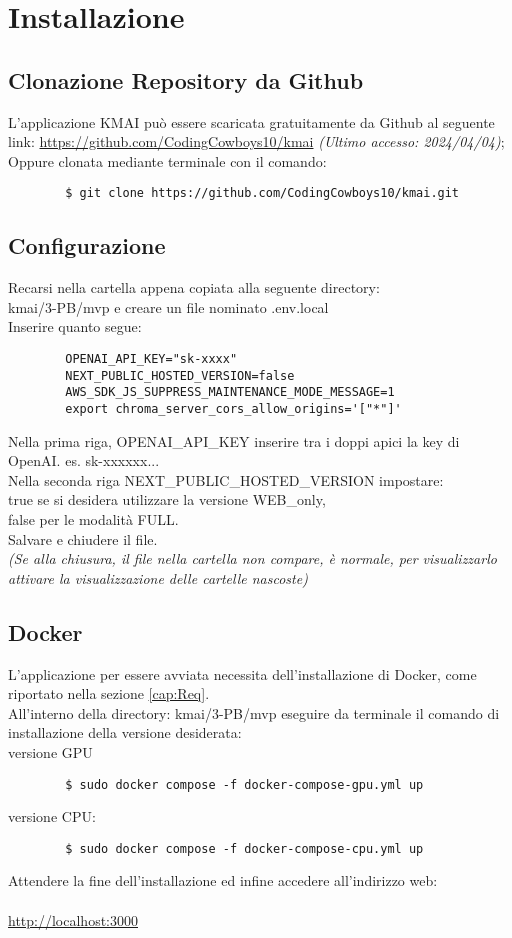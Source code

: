 \chapter{Installazione} \label{cap:Inst}
\section{Clonazione Repository da Github}
L'applicazione KMAI può essere scaricata gratuitamente da Github al seguente link: \url{https://github.com/CodingCowboys10/kmai} \textit{(Ultimo accesso: 2024/04/04)}; \\
Oppure clonata mediante terminale con il comando:
    \begin{lstlisting}
        $ git clone https://github.com/CodingCowboys10/kmai.git
    \end{lstlisting}

\section{Configurazione}
Recarsi nella cartella appena copiata alla seguente directory: \\
kmai/3-PB/mvp e creare un file nominato .env.local\\
Inserire quanto segue:
    \begin{lstlisting}
        OPENAI_API_KEY="sk-xxxx"
        NEXT_PUBLIC_HOSTED_VERSION=false
        AWS_SDK_JS_SUPPRESS_MAINTENANCE_MODE_MESSAGE=1
        export chroma_server_cors_allow_origins='["*"]'
    \end{lstlisting}
Nella prima riga, OPENAI\_API\_KEY inserire tra i doppi apici la key di OpenAI. es. sk-xxxxxx...\\
Nella seconda riga NEXT\_PUBLIC\_HOSTED\_VERSION impostare:\\ true se si desidera utilizzare la versione WEB\_only,\\ false per le modalità FULL.\\
Salvare e chiudere il file.\\
\textit{(Se alla chiusura, il file nella cartella non compare, è normale, per visualizzarlo attivare la visualizzazione delle cartelle nascoste)}

\section{Docker}
L'applicazione per essere avviata necessita dell'installazione di Docker, come riportato nella sezione \ref{cap:Req}.\\
All'interno della directory: kmai/3-PB/mvp eseguire da terminale il comando di installazione della versione desiderata: \\
versione GPU
    \begin{lstlisting}
        $ sudo docker compose -f docker-compose-gpu.yml up
    \end{lstlisting}
versione CPU:
    \begin{lstlisting}
        $ sudo docker compose -f docker-compose-cpu.yml up
    \end{lstlisting}
Attendere la fine dell'installazione ed infine accedere all'indirizzo web: \\\\
\url{http://localhost:3000}
